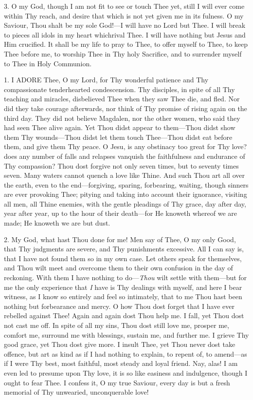 3. O my God, though I am not fit
to see or touch Thee yet, still I will ever come within Thy reach, and
desire that which is not yet given me in its fulness. O my Saviour, Thou
shalt be my sole God!—I will have no Lord but Thee. I will break to
pieces all idols in my heart which\emph{}rival Thee. I will have
nothing but Jesus and Him crucified. It shall be my life to pray to
Thee, to offer myself to Thee, to keep Thee before me, to worship
Thee in Thy holy Sacrifice, and to surrender myself to Thee in Holy
Communion.


1. I ADORE
Thee, O my Lord, for Thy wonderful patience and Thy compassionate
tenderhearted condescension. Thy disciples, in spite of all Thy teaching
and miracles, disbelieved Thee when they saw Thee die, and fled. Nor did
they take courage afterwards, nor think of Thy promise of rising again
on the third day. They did not believe Magdalen, nor the other women,
who said they had seen Thee alive again. Yet Thou didst appear to
them—Thou didst show them Thy wounds—Thou didst let them touch
Thee—Thou didst eat before them, and give them Thy peace. O Jesu, is
any obstinacy too great for Thy love? does any number of falls and
relapses vanquish the faithfulness and endurance of Thy compassion? Thou
dost forgive not only seven times, but to seventy times seven. Many
waters cannot quench a love like Thine. And such Thou art all over the
earth, even to the end—forgiving, sparing, forbearing, waiting, though
sinners are ever provoking Thee; pitying and taking into account their
ignorance, visiting all men, all Thine enemies, with the gentle
pleadings of Thy grace, day after day, year after year, up to the hour
of their death—for He knoweth whereof we are made; He knoweth we
are but dust.

2. My God, what hast Thou done
for me! Men say of Thee, O my only Good, that Thy judgments are severe,
and Thy punishments excessive. All I can say is, that I have not found
them so in my own case. Let others speak for themselves, and Thou wilt
meet and overcome them to their own confusion in the day of reckoning.
With them I have nothing to do—\emph{Thou} wilt settle with them—but
for me the only experience that \emph{I} have is Thy dealings with
myself, and here I bear witness, as I know so entirely and feel so
intimately, that to me Thou hast been nothing but forbearance and mercy.
O how Thou dost forget that I have ever rebelled against Thee! Again and
again dost Thou help me. I fall, yet Thou dost not cast me off. In spite
of all my sins, Thou dost still love me, prosper me, comfort me,
surround me with blessings, sustain me, and further me. I grieve Thy
good grace, yet Thou dost give more. I insult Thee, yet Thou never dost
take offence, but art as kind as if I had nothing to explain, to repent
of, to amend—as if I were Thy best, most faithful, most steady and
loyal friend. Nay, alas! I am even led to presume upon Thy love, it is
so like easiness and indulgence, though I ought to fear Thee. I confess
it, O my true Saviour, every day is but a fresh memorial of Thy
unwearied, unconquerable love!

